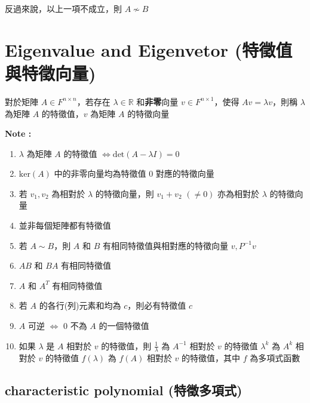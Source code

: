 \documentclass[
]{book}
\providecommand{\tightlist}{%
  \setlength{\itemsep}{0pt}\setlength{\parskip}{0pt}}
\begin{document}
反過來說，以上一項不成立，則 \(A \not\sim B\)

\hypertarget{eigenvalue-and-eigenvetor-ux7279ux5fb5ux503cux8207ux7279ux5fb5ux5411ux91cf}{%
\section{Eigenvalue and Eigenvetor (特徵值與特徵向量)}\label{eigenvalue-and-eigenvetor-ux7279ux5fb5ux503cux8207ux7279ux5fb5ux5411ux91cf}}

對於矩陣 \(A \in F^{n \times n}\)，若存在 \(\lambda \in \mathbb{R}\) 和\textbf{非零}向量 \(v \in F^{n\times 1}\)，使得 \(Av = \lambda v\)，則稱 \(\lambda\) 為矩陣 \(A\) 的特徵值，\(v\) 為矩陣 \(A\) 的特徵向量

\textbf{Note :}

\begin{enumerate}
\def\labelenumi{\arabic{enumi}.}
\tightlist
\item
  \(\lambda\) 為矩陣 \(A\) 的特徵值 \(\iff \mbox{det}(A - \lambda I) = 0\)
\item
  \(\mbox{ker}(A)\) 中的非零向量均為特徵值 \(0\) 對應的特徵向量
\item
  若 \(v_1, v_2\) 為相對於 \(\lambda\) 的特徵向量，則 \(v_1 +v_2\) \((\neq 0)\) 亦為相對於 \(\lambda\) 的特徵向量
\item
  並非每個矩陣都有特徵值
\item
  若 \(A \sim B\)，則 \(A\) 和 \(B\) 有相同特徵值與相對應的特徵向量 \(v, P^{-1}v\)
\item
  \(AB\) 和 \(BA\) 有相同特徵值
\item
  \(A\) 和 \(A^T\) 有相同特徵值
\item
  若 \(A\) 的各行(列)元素和均為 \(c\)，則必有特徵值 \(c\)
\item
  \(A\) 可逆 \(\iff\) \(0\) 不為 \(A\) 的一個特徵值
\item
  如果 \(\lambda\) 是 \(A\) 相對於 \(v\) 的特徵值，則
  \(\frac{1}{\lambda}\) 為 \(A^{-1}\) 相對於 \(v\) 的特徵值
  \(\lambda^k\) 為 \(A^k\) 相對於 \(v\) 的特徵值
  \(f(\lambda)\) 為 \(f(A)\) 相對於 \(v\) 的特徵值，其中 \(f\) 為多項式函數
\end{enumerate}

\hypertarget{characteristic-polynomial-ux7279ux5fb5ux591aux9805ux5f0f}{%
\subsection{characteristic polynomial (特徵多項式)}\label{characteristic-polynomial-ux7279ux5fb5ux591aux9805ux5f0f}}
\end{document}
